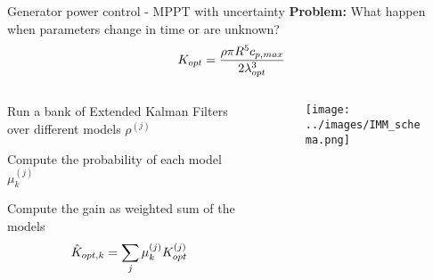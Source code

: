 \begin{frame}{Generator power control - MPPT with uncertainty}
 \textcolor{yaleblue}{\textbf{Problem:}} What happen when parameters change in time or are unknown?
  \begin{equation}
    K_{opt} =  \frac{\rho \pi R^5 c_{p,max}}{2\lambda_{opt}^3}
    \notag
  \end{equation}

  \begin{columns}
    \begin{column}{0.5\columnwidth}
      \begin{myenumerate}
        \item Run a bank of Extended Kalman Filters over different models $\rho^{(j)}$
        \item Compute the probability of each model $\mu_k^{(j)}$
        \item Compute the gain as weighted sum of the models
        \begin{gather}
          \notag
          \hat{K}_{opt,k} = \sum_j \mu_k^{(j)} K_{opt}^{(j)} 
        \end{gather}
      \end{myenumerate}
    \end{column}

    \begin{column}{0.5\columnwidth}
      \begin{figure}[H]
        \centering
        \texttt{[image: ../images/IMM\_schema.png]}
      \end{figure}
    \end{column}
  \end{columns}


\end{frame}
